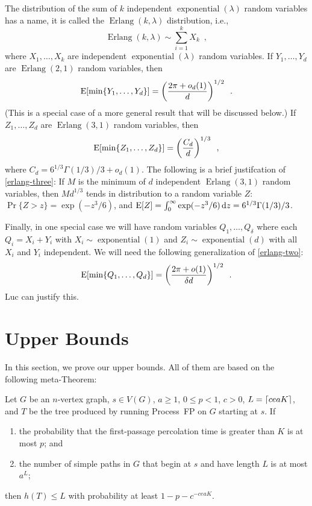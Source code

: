 \documentclass[lotsofwhite]{patmorin}
\DeclareMathOperator{\exponential}{exponential}
\DeclareMathOperator{\erlang}{Erlang}
\begin{document}
The distribution of the sum of $k$ independent $\exponential(\lambda)$
random variables has a name, it is called the $\erlang(k,\lambda)$
distribution, i.e.,
\[
    \erlang(k,\lambda) \sim \sum_{i=1}^k X_k \enspace ,
\]
where $X_1,\ldots,X_k$ are independent $\exponential(\lambda)$ random variables.
If $Y_1,\ldots,Y_d$ are $\erlang(2,1)$ random variables, then
\begin{equation}
    \E[\min\{Y_1,\ldots,Y_d\}] = \left(\frac{2\pi+o_d(1)}{d}\right)^{1/2}  \enspace . \eqlabel{erlang-two}
\end{equation}
(This is a special case of a more general result that will be discussed below.)
If $Z_1,\ldots,Z_d$ are $\erlang(3,1)$ random variables, then
\begin{equation}
    \E[\min\{Z_1,\ldots,Z_d\}] = \left(\frac{C_d}{d}\right)^{1/3}  \eqlabel{erlang-three} \enspace ,
\end{equation}
where $C_d =  6^{1/3}\Gamma (1/3) / 3 + o_d(1)$.  The following is a brief justifcation of \eqref{erlang-three}: If $M$ is the minimum of $d$ independent $\erlang(3,1)$ random 
variables, then $Md^{1/3}$ tends in distribution to a random variable 
$Z$: $\Pr\{Z>z\} = \exp(-z^3/6)$, and $\mathrm{E}[Z]= \int_0^\infty \exp(-z^3/6)\,
\mathrm{d}z = 6^{1/3}\Gamma (1/3) / 3$. 

Finally, in one special case we will have random variables
$Q_1,\ldots,Q_\delta$ where each $Q_i=X_i+Y_i$ with $X_i\sim\exponential(1)$
and $Z_i\sim\exponential(d)$ with all $X_i$ and $Y_i$ independent.  We will need the following generalization of
\eqref{erlang-two}:
\begin{equation}
   \E[\min\{Q_1,\ldots,Q_d\}] = \left(\frac{2\pi+o(1)}{\delta d}\right)^{1/2}
     \enspace .
     \eqlabel{weird-one}
\end{equation}
Luc can justify this.



\section{Upper Bounds}

In this section, we prove our upper bounds. All of them are based on
the following meta-Theorem:

\begin{lem}
   Let $G$ be an $n$-vertex graph, $s\in V(G)$, $a\ge 1$, $0\le p<1$, $c>0$, 
   $L={\lceil ceaK \rceil}$, and $T$ be the tree produced by running Process~FP
   on $G$ starting at $s$.  If 
   \begin{enumerate}
      \item the probability that the first-passage percolation time is greater than $K$ is at most $p$; and

      \item the number of simple paths in $G$ that begin at $s$ and have
        length $L$ is at most $a^L$;
   \end{enumerate}
   then $h(T) \le L$ with probability at least $1-p-c^{-ceaK}$.
\end{lem}
\end{document}
